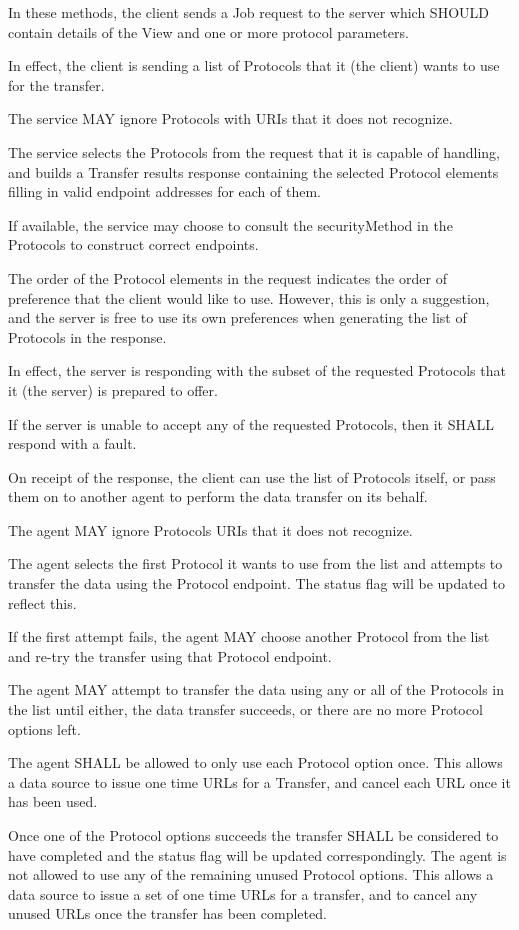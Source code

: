 \documentclass[11pt,a4paper]{ivoa}
\begin{document}
In these methods, the client sends a Job request to the server which SHOULD contain details of the View and one or more protocol parameters.

In effect, the client is sending a list of Protocols that it (the client) wants to use for the transfer.

The service MAY ignore Protocols with URIs that it does not recognize.

The service selects the Protocols from the request that it is capable of handling, and builds a Transfer results response containing the selected Protocol elements filling in valid endpoint addresses for each of them.

If available, the service may choose to consult the securityMethod in the Protocols to construct correct endpoints.

The order of the Protocol elements in the request indicates the order of preference that the client would like to use. However, this is only a suggestion, and the server is free to use its own preferences when generating the list of Protocols in the response.

In effect, the server is responding with the subset of the requested Protocols that it (the server) is prepared to offer.

If the server is unable to accept any of the requested Protocols, then it SHALL respond with a fault.

On receipt of the response, the client can use the list of Protocols itself, or pass them on to another agent to perform the data transfer on its behalf.

The agent MAY ignore Protocols URIs that it does not recognize.

The agent selects the first Protocol it wants to use from the list and attempts to transfer the data using the Protocol endpoint. The status flag will be updated to reflect this.

If the first attempt fails, the agent MAY choose another Protocol from the list and re-try the transfer using that Protocol endpoint.

The agent MAY attempt to transfer the data using any or all of the Protocols in the list until either, the data transfer succeeds, or there are no more Protocol options left.

The agent SHALL be allowed to only use each Protocol option once. This allows a data source to issue one time URLs for a Transfer, and cancel each URL once it has been used.

Once one of the Protocol options succeeds the transfer SHALL be considered to have completed and the status flag will be updated correspondingly. The agent is not allowed to use any of the remaining unused Protocol options. This allows a data source to issue a set of one time URLs for a transfer, and to cancel any unused URLs once the transfer has been completed.
\end{document}
